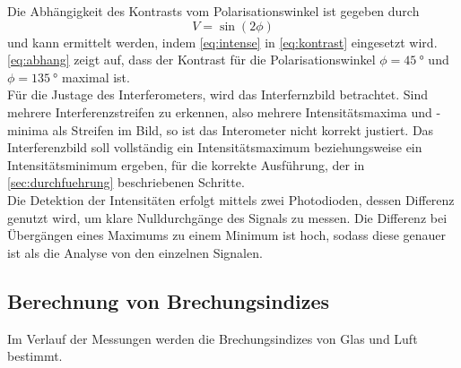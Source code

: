 Die Abhängigkeit des Kontrasts vom Polarisationswinkel ist gegeben durch
\begin{equation}
    V = \sin\left(2\phi\right)
    \label{eq:abhang}
\end{equation}
und kann ermittelt werden, indem \autoref{eq:intense} in \autoref{eq:kontrast} eingesetzt wird.\\
\autoref{eq:abhang} zeigt auf, dass der Kontrast für die Polarisationswinkel $\phi = \SI{45}{\degree}$ und $\phi = \SI{135}{\degree}$ maximal ist.\\
\newline
Für die Justage des Interferometers, wird das Interfernzbild betrachtet.
Sind mehrere Interferenzstreifen zu erkennen, also mehrere Intensitätsmaxima und -minima als Streifen im Bild, so ist das Interometer nicht korrekt justiert.
Das Interferenzbild soll vollständig ein Intensitätsmaximum beziehungsweise ein Intensitätsminimum ergeben, für die korrekte Ausführung, der in \autoref{sec:durchfuehrung} beschriebenen Schritte.\\
Die Detektion der Intensitäten erfolgt mittels zwei Photodioden, dessen Differenz genutzt wird, um klare Nulldurchgänge des Signals zu messen.
Die Differenz bei Übergängen eines Maximums zu einem Minimum ist hoch, sodass diese genauer ist als die Analyse von den einzelnen Signalen.

\subsection{Berechnung von Brechungsindizes}
Im Verlauf der Messungen werden die Brechungsindizes von Glas und Luft bestimmt.
